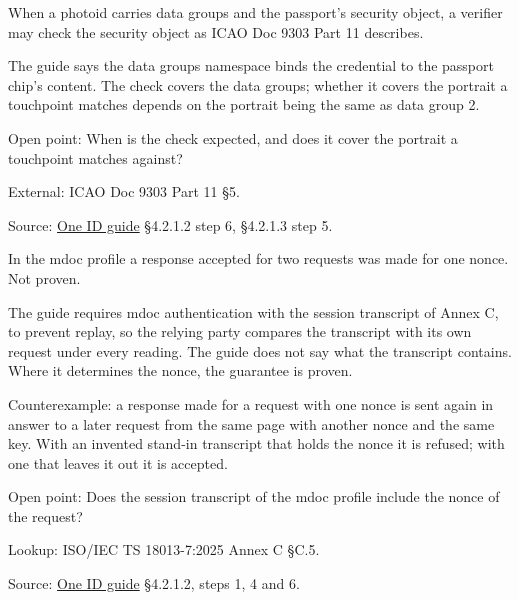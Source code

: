 \begin{definition}
  \label{def:c64}
  \notready
  When a photoid carries data groups and the passport's security object, a
  verifier may check the security object as ICAO Doc 9303 Part 11 describes.

  The guide says the data groups namespace binds the credential to the
  passport chip's content. The check covers the data groups; whether it
  covers the portrait a touchpoint matches depends on the portrait being the
  same as data group 2.

  Open point: When is the check expected, and does it cover the portrait a
  touchpoint matches against?

  External: ICAO Doc 9303 Part 11 §5.

  Source:
  \href{https://standards.atlassian.net/wiki/spaces/OneID/pages/2947416082/Technical+Implementation+Guide}{One
  ID guide} §4.2.1.2 step 6, §4.2.1.3 step 5.
\end{definition}

\begin{theorem}
  \label{thm:mdoc-nonce}
  In the mdoc profile a response accepted for two requests was made for one
  nonce.  Not proven.

  The guide requires mdoc authentication with the session transcript of Annex
  C, to prevent replay, so the relying party compares the transcript with its
  own request under every reading.  The guide does not say what the
  transcript contains.  Where it determines the nonce, the guarantee is
  proven.

  Counterexample: a response made for a request with one nonce is sent again
  in answer to a later request from the same page with another nonce and the
  same key.  With an invented stand-in transcript that holds the nonce it is
  refused; with one that leaves it out it is accepted.

  Open point: Does the session transcript of the mdoc profile include the
  nonce of the request?

  Lookup: ISO/IEC TS 18013-7:2025 Annex C §C.5.

  Source:
  \href{https://standards.atlassian.net/wiki/spaces/OneID/pages/2947416082/Technical+Implementation+Guide}{One ID guide} §4.2.1.2, steps 1, 4 and 6.
\end{theorem}

